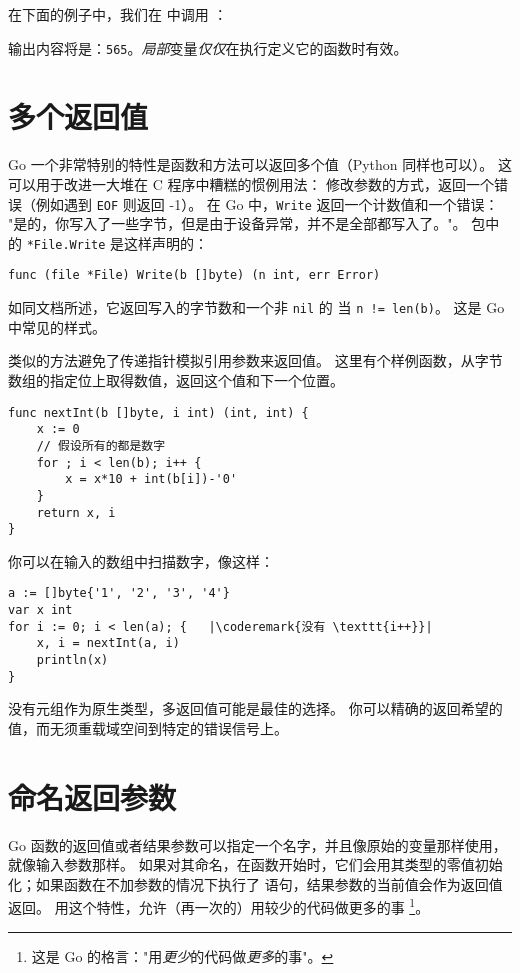 在下面的例子中，我们在  中调用 ：



输出内容将是：\texttt{565}。\emph{局部}变量\emph{仅仅}在执行定义它的函数时有效。

\section{多个返回值}
\label{sec:multiple return}
Go 一个非常特别的特性是函数和方法可以返回多个值（Python 同样也可以）。
这可以用于改进一大堆在 C 程序中糟糕的惯例用法：
修改参数的方式，返回一个错误（例如遇到 \texttt{EOF} 则返回 -1）。
在 Go 中，\lstinline{Write} 返回一个计数值和一个错误：
"是的，你写入了一些字节，但是由于设备异常，并不是全部都写入了。"。
 包中的 \lstinline{*File.Write} 是这样声明的：
\begin{lstlisting}
func (file *File) Write(b []byte) (n int, err Error)
\end{lstlisting}
如同文档所述，它返回写入的字节数和一个非 \lstinline{nil} 的 
当 \lstinline{n != len(b)}。
这是 Go 中常见的样式。

类似的方法避免了传递指针模拟引用参数来返回值。
这里有个样例函数，从字节数组的指定位上取得数值，返回这个值和下一个位置。
\begin{lstlisting}
func nextInt(b []byte, i int) (int, int) {
    x := 0
    // 假设所有的都是数字
    for ; i < len(b); i++ {
        x = x*10 + int(b[i])-'0'
    }
    return x, i
}
\end{lstlisting}
你可以在输入的数组中扫描数字，像这样：
\begin{lstlisting}
a := []byte{'1', '2', '3', '4'}
var x int
for i := 0; i < len(a); {	|\coderemark{没有 \texttt{i++}}|
    x, i = nextInt(a, i)
    println(x)
}
\end{lstlisting}
没有元组作为原生类型，多返回值可能是最佳的选择。
你可以精确的返回希望的值，而无须重载域空间到特定的错误信号上。

\section{命名返回参数}
\label{sec:named result parameters}
Go 函数的返回值或者结果参数可以指定一个名字，并且像原始的变量那样使用，就像输入参数那样。
如果对其命名，在函数开始时，它们会用其类型的零值初始化；如果函数在不加参数的情况下执行了
 语句，结果参数的当前值会作为返回值返回。
用这个特性，允许（再一次的）用较少的代码做更多的事
\footnote{这是 Go 的格言："用\emph{更少}的代码做\emph{更多}的事"。}。

